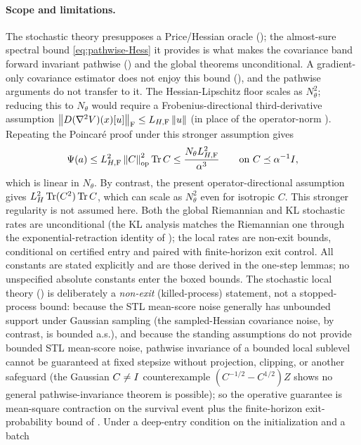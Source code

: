 \paragraph{Scope and limitations.}
The stochastic theory presupposes a Price/Hessian oracle (); the almost-sure
spectral bound \eqref{eq:pathwise-Hess} it provides is what makes the covariance band forward
invariant pathwise () and the global theorems unconditional. A gradient-only
covariance estimator does not enjoy this bound (), and the pathwise arguments do not
transfer to it. The Hessian-Lipschitz floor scales as $N_\theta^2$; reducing this to $N_\theta$ would
require a Frobenius-directional third-derivative assumption
$\left\lVert D(\nabla^2V)(x)[u]\right\rVert_{\mathrm{F}}\leq L_{H,\mathrm{F}}\left\lVert u\right\rVert$ (in place of the operator-norm
). Repeating the Poincar\'e proof under this stronger assumption gives
\[
    \Psi(a)\leq L_{H,\mathrm{F}}^2\left\lVert C\right\rVert_{\mathrm{op}}^2\operatorname{Tr} C
    \leq \frac{N_\theta L_{H,\mathrm{F}}^2}{\alpha^3}
    \qquad\text{on }C\preceq\alpha^{-1}I,
\]
which is linear in $N_\theta$. By contrast, the present operator-directional assumption gives
$L_H^2\operatorname{Tr}(C^2)\operatorname{Tr} C$, which can scale as $N_\theta^2$ even for isotropic $C$. This stronger regularity
is not assumed here. Both the global Riemannian and KL
stochastic rates are unconditional (the KL analysis matches the Riemannian one through the
exponential-retraction identity of ); the local rates are non-exit bounds,
conditional on certified entry and paired with finite-horizon exit control. All constants are stated
explicitly and are those derived in the one-step lemmas; no unspecified absolute constants enter the
boxed bounds.
The stochastic local theory () is deliberately a \emph{non-exit}
(killed-process) statement, not a stopped-process bound: because the STL mean-score noise generally
has unbounded support under Gaussian sampling (the sampled-Hessian covariance noise, by contrast, is
bounded a.s.), and because the standing assumptions do not provide bounded STL mean-score noise,
pathwise invariance of a bounded local sublevel cannot be guaranteed at fixed stepsize without
projection, clipping, or another safeguard (the Gaussian $C\neq I$ counterexample $(C^{-1/2}-C^{1/2})Z$
shows no general pathwise-invariance theorem is possible); so the operative guarantee is mean-square
contraction on the survival event plus the
finite-horizon exit-probability bound of . Under a deep-entry condition on
the initialization and a batch
